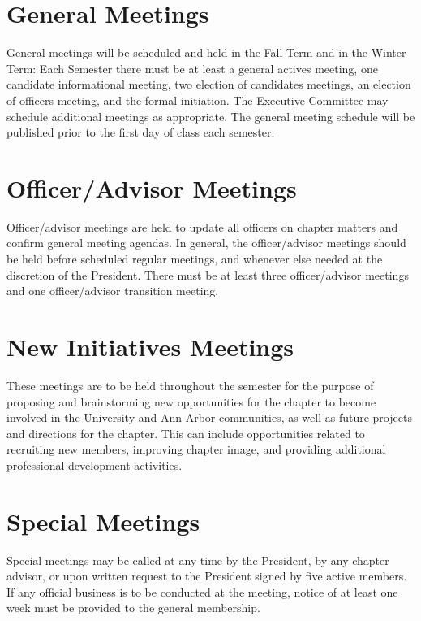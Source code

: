 \section{General Meetings}\label{sec:genmeetings}
General meetings will be scheduled and held in the Fall Term and in the Winter Term: Each Semester there must be at least a general actives meeting, one candidate informational meeting, two election of candidates meetings, an election of officers meeting, and the formal initiation.
The Executive Committee may schedule additional meetings as appropriate.
The general meeting schedule will be published prior to the first day of class each semester.


\section{Officer/Advisor Meetings}
Officer/advisor meetings are held to update all officers on chapter matters and confirm general meeting agendas.
In general, the officer/advisor meetings should be held before scheduled regular meetings, and whenever else needed at the discretion of the President.
There must be at least three officer/advisor meetings and one officer/advisor transition meeting.

\section{New Initiatives Meetings}
\label{sec:NImeetings} These meetings are to be held throughout the semester for the purpose of proposing and brainstorming new opportunities for the chapter to become involved in the University and Ann Arbor communities, as well as future projects and directions for the chapter.
This can include opportunities related to recruiting new members, improving chapter image, and providing additional professional development activities.

\section{Special Meetings}
Special meetings may be called at any time by the President, by any chapter advisor, or upon written request to the President signed by five active members.
If any official business is to be conducted at the meeting, notice of at least one week must be provided to the general membership.
